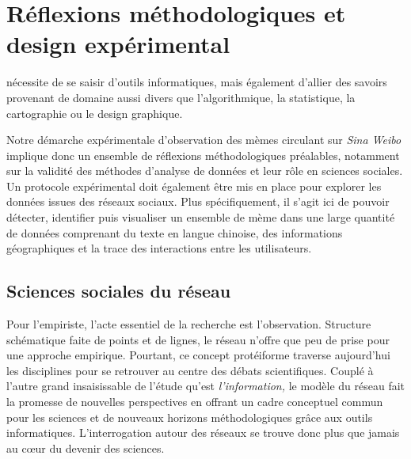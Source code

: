 \chapter{Réflexions méthodologiques et design expérimental}

 nécessite de se saisir d'outils informatiques, mais également d'allier des savoirs provenant de domaine aussi divers que l'algorithmique, la statistique, la cartographie ou le design graphique.

Notre démarche expérimentale d'observation des mèmes circulant sur \textit{Sina Weibo} implique donc un ensemble de réflexions méthodologiques préalables, notamment sur la validité des méthodes d'analyse de données et leur rôle en sciences sociales. Un protocole expérimental doit également être mis en place pour explorer les données issues des réseaux sociaux. Plus spécifiquement, il s'agit ici de pouvoir détecter, identifier puis visualiser un ensemble de mème dans une large quantité de données comprenant du texte en langue chinoise, des informations géographiques et la trace des interactions entre les utilisateurs.


\section[Sciences sociales du réseau]{Sciences sociales du réseau}
Pour l{\textquoteright}empiriste, l{\textquoteright}acte essentiel de la recherche est l{\textquoteright}observation. Structure schématique faite de points et de lignes, le réseau n{\textquoteright}offre que peu de prise pour une approche empirique. Pourtant, ce concept protéiforme traverse aujourd{\textquoteright}hui les disciplines pour se retrouver au centre des débats scientifiques. Couplé à l{\textquoteright}autre grand insaisissable de l{\textquoteright}étude qu{\textquoteright}est \textit{l{\textquoteright}information, }le modèle du réseau fait la promesse de nouvelles perspectives en offrant un cadre conceptuel commun pour les sciences et de nouveaux horizons méthodologiques gr\^ace aux outils informatiques. L{\textquoteright}interrogation autour des réseaux se trouve donc plus que jamais au c{\oe}ur du devenir des sciences. 

